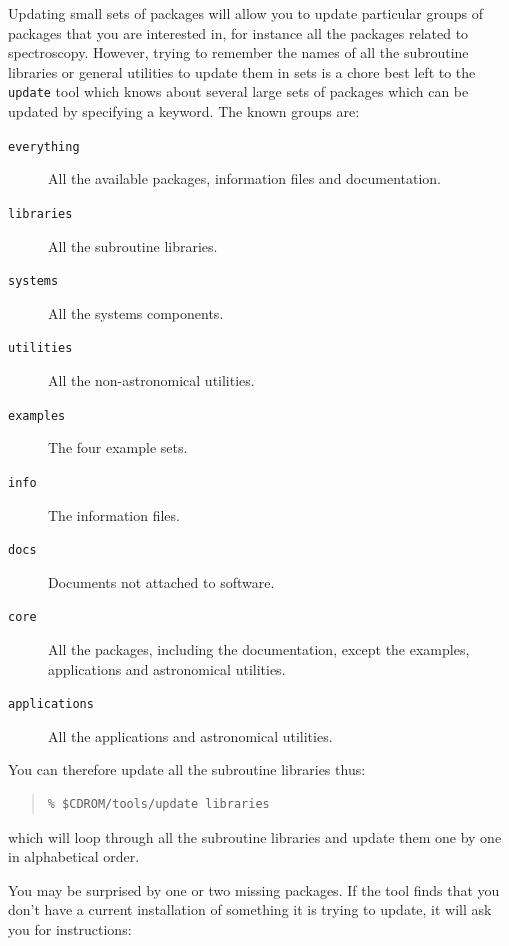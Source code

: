 \documentclass[twoside,11pt]{article}
\renewcommand{\_}{\texttt{\symbol{95}}}
\begin{document}
Updating small sets of packages will allow you to update particular groups
of packages that you are interested in, for instance all the packages
related to spectroscopy.  However, trying to remember the names of all
the subroutine libraries or general utilities to update them in sets is
a chore best left to the \texttt{update} tool which knows about several
large sets of packages which can be updated by specifying a keyword.
The known groups are:

\begin{description}

\item[\texttt{everything}] All the available packages, information files and
documentation.

\item[\texttt{libraries}] All the subroutine libraries.

\item[\texttt{systems}] All the systems components.

\item[\texttt{utilities}] All the non-astronomical utilities.

\item[\texttt{examples}] The four example sets.

\item[\texttt{info}] The information files.

\item[\texttt{docs}] Documents not attached to software.

\item[\texttt{core}] All the packages, including the documentation, except
the examples, applications and astronomical utilities.

\item[\texttt{applications}] All the applications and astronomical
utilities.

\end{description}

You can therefore update all the subroutine libraries thus:

\begin{quote}
\begin{verbatim}
% $CDROM/tools/update libraries
\end{verbatim}
\end{quote}

which will loop through all the subroutine libraries and update them
one by one in alphabetical order.

You may be surprised by one or two missing packages.  If the tool finds
that you don't have a current installation of something it is trying to
update, it will ask you for instructions:
\end{document}
